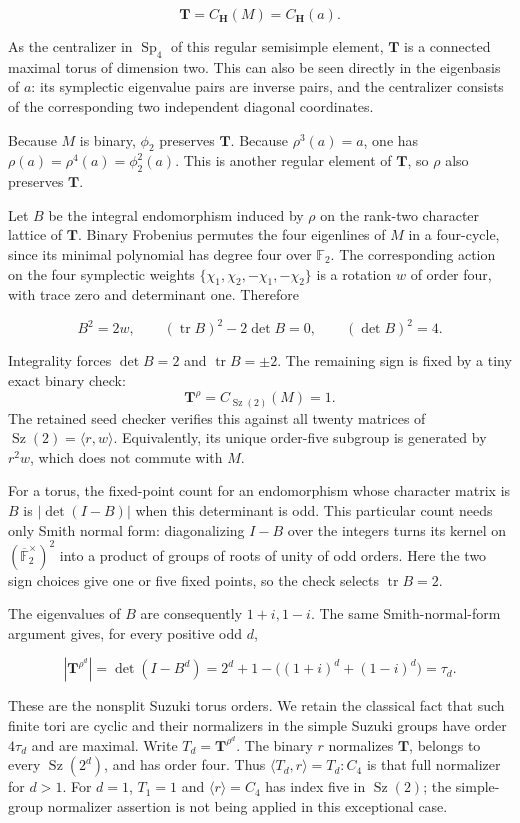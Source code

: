 \documentclass[11pt,a4paper]{article}
\begin{document}
\[
\mathbf T=C_{\mathbf H}(M)=C_{\mathbf H}(a).
\]

As the centralizer in \(\operatorname{Sp}_4\) of this regular semisimple
element, \(\mathbf T\) is a connected maximal torus of dimension two.
This can also be seen directly in the eigenbasis of \(a\): its
symplectic eigenvalue pairs are inverse pairs, and the centralizer
consists of the corresponding two independent diagonal coordinates.

Because \(M\) is binary, \(\phi_2\) preserves \(\mathbf T\). Because
\(\rho^3(a)=a\), one has \(\rho(a)=\rho^4(a)=\phi_2^2(a)\). This is
another regular element of \(\mathbf T\), so \(\rho\) also preserves
\(\mathbf T\).

Let \(B\) be the integral endomorphism induced by \(\rho\) on the
rank-two character lattice of \(\mathbf T\). Binary Frobenius permutes
the four eigenlines of \(M\) in a four-cycle, since its minimal
polynomial has degree four over \(\mathbb F_2\). The corresponding
action on the four symplectic weights
\(\{\chi_1,\chi_2,-\chi_1,-\chi_2\}\) is a rotation \(w\) of order four,
with trace zero and determinant one. Therefore

\[
B^2=2w,\qquad
(\operatorname{tr} B)^2-2\det B=0,\qquad(\det B)^2=4.
\]

Integrality forces \(\det B=2\) and \(\operatorname{tr}B=\pm2\). The
remaining sign is fixed by a tiny exact binary check: \[
\mathbf T^\rho=C_{\operatorname{Sz}(2)}(M)=1.
\] The retained seed checker verifies this against all twenty matrices
of \(\operatorname{Sz}(2)=\langle r,w\rangle\). Equivalently, its unique
order-five subgroup is generated by \(r^2w\), which does not commute
with \(M\).

For a torus, the fixed-point count for an endomorphism whose character
matrix is \(B\) is \(|\det(I-B)|\) when this determinant is odd. This
particular count needs only Smith normal form: diagonalizing \(I-B\)
over the integers turns its kernel on
\((\overline{\mathbb F}_2^\times)^2\) into a product of groups of roots
of unity of odd orders. Here the two sign choices give one or five fixed
points, so the check selects \(\operatorname{tr}B=2\).

The eigenvalues of \(B\) are consequently \(1+i,1-i\). The same
Smith-normal-form argument gives, for every positive odd \(d\),

\[
|\mathbf T^{\rho^d}|=\det(I-B^d)
=2^d+1-\big((1+i)^d+(1-i)^d\big)=\tau_d.
\]

These are the nonsplit Suzuki torus orders. We retain the classical fact
that such finite tori are cyclic and their normalizers in the simple
Suzuki groups have order \(4\tau_d\) and are maximal. Write
\(T_d=\mathbf T^{\rho^d}\). The binary \(r\) normalizes \(\mathbf T\),
belongs to every \(\operatorname{Sz}(2^d)\), and has order four. Thus
\(\langle T_d,r\rangle=T_d:C_4\) is that full normalizer for \(d>1\).
For \(d=1\), \(T_1=1\) and \(\langle r\rangle=C_4\) has index five in
\(\operatorname{Sz}(2)\); the simple-group normalizer assertion is not
being applied in this exceptional case.
\end{document}
